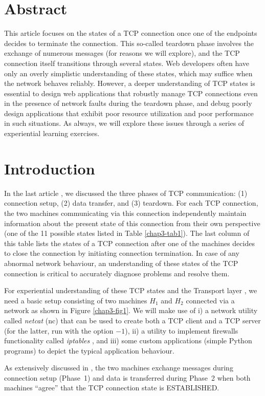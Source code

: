 \begin{multicols}{2}

\setcounter{figure}{0}
\section*{Abstract}

This article focuses on the states of a TCP connection once one of the endpoints decides to terminate the connection. This so-called teardown phase involves the exchange of numerous messages (for reasons we will explore), and the TCP connection itself transitions through several states. Web developers often have only an overly simplistic understanding of these states, which may suffice when the network behaves reliably. However, a deeper understanding of TCP states is essential to design web applications that robustly manage TCP connections even in the presence of network faults during the teardown phase, and debug poorly design applications that exhibit poor resource utilization and poor performance in such situations. As always, we will explore these issues through a series of experiential learning exercises.

\section{Introduction}


In the last article \cite{chap3-key8}, we discussed the three phases of TCP \cite{chap3-key1} communication: (1) connection setup, (2) data transfer, and (3) teardown. For each TCP connection, the two machines communicating via this connection independently maintain information about the present state of this connection from their own perspective (one of the 11 possible states listed in Table \ref{chap3-tab1}). The last column of this table lists the states of a TCP connection after one of the machines decides to close the connection by initiating connection termination. In case of any abnormal network behaviour, an understanding of these states of the TCP connection is critical to accurately diagnose problems and resolve them.

For experiential understanding of these TCP states and the Transport layer \cite{chap3-key2}, we need a basic setup consisting of two machines $H_{1}$ and $H_{2}$ connected via a network as shown in Figure \ref{chap3-fig1}. We will make use of i) a network utility called \textit{netcat} (nc) \cite{chap3-key5}\cite{chap3-key6} that can be used to create both a TCP client and a TCP server (for the latter, run with the option $-1$), ii) a utility to implement firewalls functionality called \textit{iptables} \cite{chap3-key7}, and iii) some custom applications (simple Python programs) to depict the typical application behaviour.

As extensively discussed in \cite{chap3-key8}, the two machines exchange messages during connection setup (Phase~1) and data is transferred during Phase~2 when both machines ``agree'' that the TCP connection state is ESTABLISHED.
\end{multicols}

